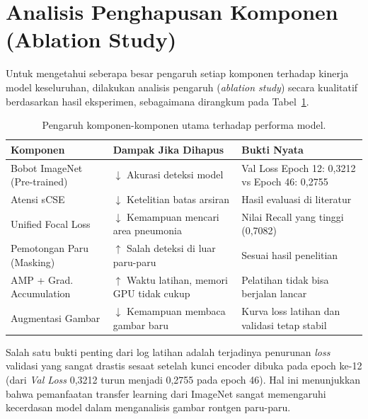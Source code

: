 \documentclass[12pt,a4paper,oneside]{book}
\begin{document}
\section{Analisis Penghapusan Komponen (Ablation Study)}

Untuk mengetahui seberapa besar pengaruh setiap komponen terhadap kinerja model keseluruhan, dilakukan analisis pengaruh (\textit{ablation study}) secara kualitatif berdasarkan hasil eksperimen, sebagaimana dirangkum pada Tabel~\ref{tab:ablation}.

\begin{table}[htbp]
  \centering
  \caption{Pengaruh komponen-komponen utama terhadap performa model.}
  \label{tab:ablation}
  \begin{tabularx}{\textwidth}{lXX}
    \toprule
    \textbf{Komponen} & \textbf{Dampak Jika Dihapus} & \textbf{Bukti Nyata} \\
    \midrule
    Bobot ImageNet (Pre-trained) & $\downarrow$ Akurasi deteksi model & Val Loss Epoch 12: 0,3212 vs Epoch 46: 0,2755 \\
    Atensi sCSE         & $\downarrow$ Ketelitian batas arsiran  & Hasil evaluasi di literatur \textcite{roy2018scse} \\
    Unified Focal Loss  & $\downarrow$ Kemampuan mencari area pneumonia & Nilai Recall yang tinggi (0,7082) \\
    Pemotongan Paru (Masking)  & $\uparrow$ Salah deteksi di luar paru-paru & Sesuai hasil penelitian \textcite{teixeira2020} \\
    AMP + Grad. Accumulation & $\uparrow$ Waktu latihan, memori GPU tidak cukup & Pelatihan tidak bisa berjalan lancar \\
    Augmentasi Gambar        & $\downarrow$ Kemampuan membaca gambar baru & Kurva loss latihan dan validasi tetap stabil \\
    \bottomrule
  \end{tabularx}
\end{table}

Salah satu bukti penting dari log latihan adalah terjadinya penurunan \textit{loss} validasi yang sangat drastis sesaat setelah kunci encoder dibuka pada epoch ke-12 (dari \textit{Val Loss} 0,3212 turun menjadi 0,2755 pada epoch 46). Hal ini menunjukkan bahwa pemanfaatan transfer learning dari ImageNet sangat memengaruhi kecerdasan model dalam menganalisis gambar rontgen paru-paru.
\end{document}
